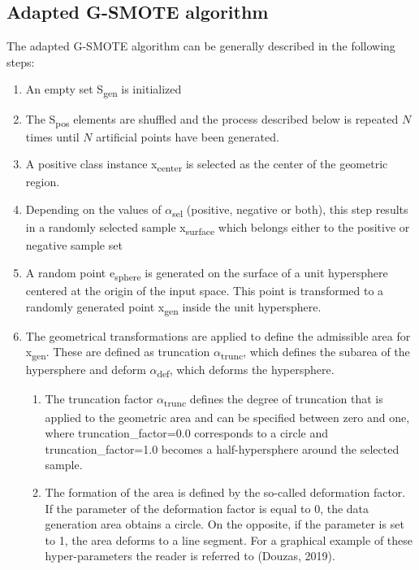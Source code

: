 \documentclass[parskip=full]{scrartcl}
\begin{document}

\subsection{Adapted G-SMOTE algorithm}

The adapted G-SMOTE algorithm can be generally described in the following steps:

\begin{enumerate}
	\item 
	An empty set S\textsubscript{gen} is initialized
	\item 
	The S\textsubscript{pos} elements are shuffled and the process described 
	below is repeated $\mathit{N}$ times until $\mathit{N}$ artificial points 
	have been generated.
	\item 
	A positive class instance x\textsubscript{center} is selected as the center 
	of the geometric region.
	\item 
	Depending on the values of $\alpha$\textsubscript{sel} (positive, negative 
	or both), this step results in a randomly selected sample 
	x\textsubscript{surface} which belongs either to the positive or negative 
	sample set
	\item 
	A random point e\textsubscript{sphere} is generated on the surface of a 
	unit hypersphere centered at the origin of the input space. This point is 
	transformed to a randomly generated point x\textsubscript{gen} inside the 
	unit hypersphere. 
	\item 
	The geometrical transformations are applied to define the admissible area 
	for x\textsubscript{gen}. These are defined as truncation 
	$\alpha$\textsubscript{trunc}, which defines the subarea of the hypersphere 
	and deform $\alpha$\textsubscript{def}, which deforms the hypersphere. 
	
	\begin{enumerate}[label=($\alph*$)]
		\item 
		The truncation factor $\alpha$\textsubscript{trunc} defines the degree 
		of truncation that is applied to the geometric area and can be 
		specified between zero and one, where truncation\_factor=0.0 
		corresponds to a circle and truncation\_factor=1.0 becomes a 
		half-hypersphere around the selected sample. 
		
		\item 
		The formation of the area is defined by the so-called deformation 
		factor. If the parameter of the deformation factor is equal to 0, the 
		data generation area obtains a circle. On the opposite, if the 
		parameter is set to 1, the area deforms to a line segment. 
		For a graphical example of these hyper-parameters the reader is referred 
		to (Douzas, 2019).
	\end{enumerate}


\end{enumerate}
\end{document}
